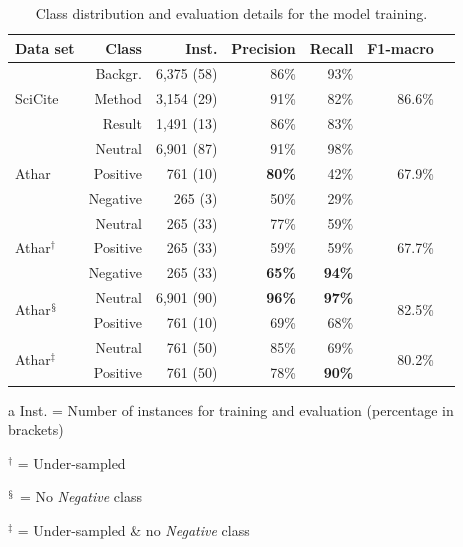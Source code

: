 \begin{table}
\caption{Class distribution and evaluation details for the model training.}
 \label{tab:classdist}
  \centering
  \begin{small}
 \begin{threeparttable}
 \begin{tabular}{lrrrrrr}
 \toprule
   Data set & Class & Inst.\tnote{a}\hphantom{\,} & Precision & Recall & F1-macro \\
   \midrule
   \multirow{3}{*}{SciCite} & Backgr. & 6,375 (58) & 86\% & 93\% & \multirow{3}{*}{86.6\%}\\
                            & Method & 3,154 (29) & 91\% & 82\%\\
                            & Result & 1,491 (13) & 86\% & 83\% \\ \midrule\midrule
  \multirow{3}{*}{Athar} & Neutral & 6,901 (87) & 91\% & 98\% & \multirow{3}{*}{67.9\%} \\
                          & Positive & 761 (10) & \textbf{80\%} & 42\% \\
                          & Negative & 265 (3) & 50\% & 29\% \\ \midrule
  \multirow{3}{*}{Athar$^{\dagger}$} & Neutral & 265 (33) & 77\% & 59\% & \multirow{3}{*}{67.7\%} \\
                          & Positive & 265 (33) & 59\% & 59\% \\
                          & Negative & 265 (33) & \textbf{65\%} & \textbf{94\%} \\ \midrule
    \multirow{2}{*}{Athar$^{\mathsection}$} & Neutral & 6,901 (90) & \textbf{96\%} & \textbf{97\%} & \multirow{2}{*}{82.5\%} \\
                            & Positive & 761 (10) & 69\% & 68\% \\ \midrule
    \multirow{2}{*}{Athar$^{\ddagger}$} & Neutral & 761 (50) & 85\% & 69\% & \multirow{2}{*}{80.2\%} \\
                            & Positive & 761 (50) & 78\% & \textbf{90\%} \\
   \bottomrule
 \end{tabular}
 \begin{tablenotes}
    \item[a] Inst. = Number of instances for training and evaluation (percentage in brackets)
    \item $^{\dagger}$ = Under-sampled
    \item $^{\mathsection}$ = No \textit{Negative} class
    \item $^{\ddagger}$ = Under-sampled \& no \textit{Negative} class
 \end{tablenotes}
\end{threeparttable}
  \end{small}
\end{table}

